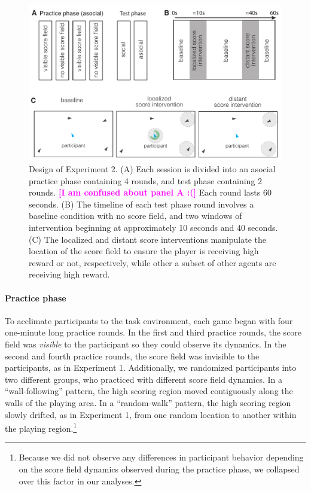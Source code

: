 \documentclass[12pt,letterpaper]{article}
\newcommand{\andrew}[1]{\textcolor{magenta}{\bf [#1]}}
\begin{document}
\begin{figure}[t!]
  \centering
  \includegraphics[width=1\textwidth]{./figures/exp2_design.pdf}
  \caption{Design of Experiment 2. (A) Each session is divided into an asocial practice phase containing 4 rounds, and test phase containing 2 rounds. \andrew{I am confused about panel A :(} Each round lasts 60 seconds. (B) The timeline of each test phase round involves a baseline condition with no score field, and two windows of intervention beginning at approximately 10 seconds and 40 seconds. (C) The localized and distant score interventions manipulate the location of the score field to ensure the player is receiving high reward or not, respectively, while other a subset of other agents are receiving high reward. }
  \label{fig:exp2_design}
\end{figure}


\paragraph{Practice phase}

To acclimate participants to the task environment, each game began with four one-minute long practice rounds. 
In the first and third practice rounds, the score field was \emph{visible} to the participant so they could observe its dynamics.
In the second and fourth practice rounds, the score field was invisible to the participants, as in Experiment 1. 
Additionally, we randomized participants into two different groups, who practiced with different score field dynamics. 
In a ``wall-following'' pattern, the high scoring region moved contiguously along the walls of the playing area. 
In a ``random-walk'' pattern, the high scoring region slowly drifted, as in Experiment 1, from one random location to another within the playing region.\footnote{Because we did not observe any differences in participant behavior depending on the score field dynamics observed during the practice phase, we collapsed over this factor in our analyses.}
\end{document}
